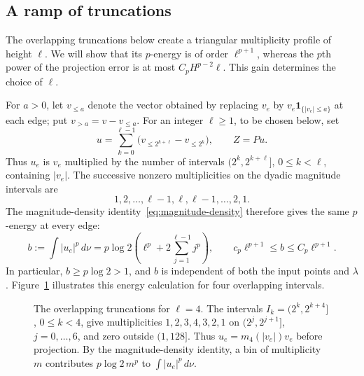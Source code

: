 \documentclass[11pt]{article}
\theoremstyle{remark}
\numberwithin{equation}{section}
\begin{document}
\subsection{A ramp of truncations}

The overlapping truncations below create a triangular multiplicity
profile of height $\ell$. We will show that its $p$-energy is of order
$\ell^{p+1}$, whereas the $p$th power of the projection error is at
most $C_pH^{p-2}\ell$. This gain determines the choice of $\ell$.

For $a>0$, let $v_{\le a}$ denote the vector obtained by replacing
$v_e$ by $v_e\mathbf 1_{\{|v_e|\le a\}}$ at each edge; put
$v_{>a}=v-v_{\le a}$. For an integer $\ell\ge1$, to be chosen below, set
\begin{equation}
 u=\sum_{k=0}^{\ell-1}
       \bigl(v_{\le 2^{k+\ell}}-v_{\le 2^k}\bigr),
 \qquad Z=Pu.
 \label{eq:above-ramp}
\end{equation}
Thus $u_e$ is $v_e$ multiplied by the number of intervals
$(2^k,2^{k+\ell}]$, $0\le k<\ell$, containing $|v_e|$.
The successive nonzero multiplicities on the dyadic magnitude intervals
are
\[
 1,2,\ldots,\ell-1,\ell,\ell-1,\ldots,2,1.
\]
The magnitude-density identity~\eqref{eq:magnitude-density} therefore gives the
same $p$-energy at every edge:
\begin{equation}
 b:=\int |u_e|^p\,d\nu
   =p\log2\left(\ell^p+2\sum_{j=1}^{\ell-1}j^p\right),
 \qquad
 c_p\ell^{p+1}\le b\le C_p\ell^{p+1}.
 \label{eq:above-energy}
\end{equation}
In particular, $b\ge p\log2>1$, and $b$ is independent of both the
input points and $\lambda$.
Figure~\ref{fig:truncation-ramp} illustrates this energy calculation
for four overlapping intervals.

\begin{figure}[htbp]
\centering

\caption{The overlapping truncations for $\ell=4$.
The intervals $I_k=(2^k,2^{k+4}]$, $0\le k<4$, give multiplicities
$1,2,3,4,3,2,1$ on $(2^j,2^{j+1}]$, $j=0,\ldots,6$, and zero
outside $(1,128]$. Thus $u_e=m_4(|v_e|)v_e$ before projection.
By the magnitude-density identity, a bin of multiplicity $m$
contributes $p\log 2\,m^p$ to $\int|u_e|^p\,d\nu$.}
\label{fig:truncation-ramp}
\end{figure}
\end{document}
